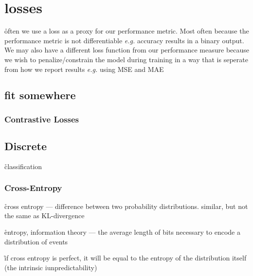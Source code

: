 
\section{losses}



\r{often we use a loss as a proxy for our performance metric. Most often because the performance metric is not differentiable \textit{e.g.} accuracy results in a binary output. We may also have a different loss function from our performance measure because we wish to penalize/constrain the model during training in a way that is seperate from how we report results \textit{e.g.} using MSE and MAE}

\subsection{fit somewhere}

\subsubsection{Contrastive Losses}



\subsection{Discrete}

\r{classification}


\subsubsection{Cross-Entropy}




\r{cross entropy --- difference between two probability distributions. similar, but not the same as KL-divergence}

\r{entropy, information theory --- the average length of bits necessary to encode a distribution of events}

\r{if cross entropy is perfect, it will be equal to the entropy of the distribution itself (the intrinsic iunpredictability)}

